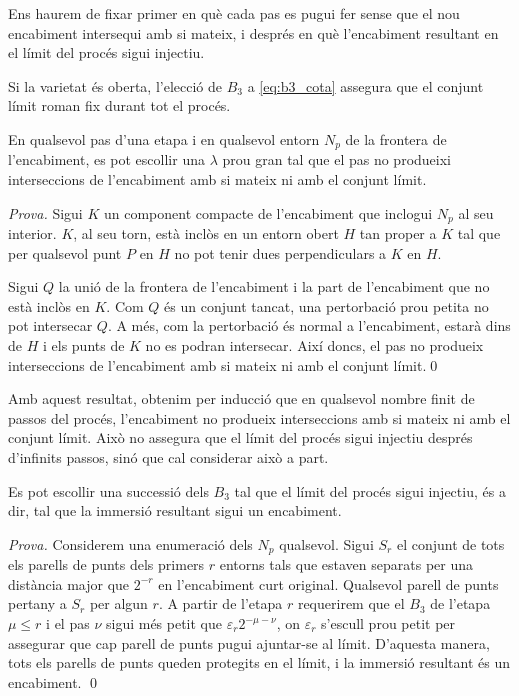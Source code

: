 Ens haurem de fixar primer en què cada pas es pugui fer sense que el nou encabiment intersequi amb si mateix, i després en què l'encabiment resultant en el límit del procés sigui injectiu.
\begin{obs}
    Si la varietat és oberta, l'elecció de $B_3$ a \eqref{eq:b3_cota} assegura que el conjunt límit roman fix durant tot el procés.
\end{obs}
\begin{prop}
    En qualsevol pas d'una etapa i en qualsevol entorn $N_p$ de la frontera de l'encabiment, es pot escollir una $\lambda$ prou gran tal que el pas no produeixi interseccions de l'encabiment amb si mateix ni amb el conjunt límit.
\end{prop}
{
\color{black} \textit{Prova.} 
    Sigui $K$ un component compacte de l'encabiment que inclogui $N_p$ al seu interior. $K$, al seu torn, està inclòs en un entorn obert $H$ tan proper a $K$ tal que per qualsevol punt $P$ en $H$ no pot tenir dues perpendiculars a $K$ en $H$.

    Sigui $Q$ la unió de la frontera de l'encabiment i la part de l'encabiment que no està inclòs en $K$. Com $Q$ és un conjunt tancat, una pertorbació prou petita no pot intersecar $Q$. A més, com la pertorbació és normal a l'encabiment, estarà dins de $H$ i els punts de $K$ no es podran intersecar. Així doncs, el pas no produeix interseccions de l'encabiment amb si mateix ni amb el conjunt límit.\qed
}

Amb aquest resultat, obtenim per inducció que en qualsevol nombre finit de passos del procés, l'encabiment no produeix interseccions amb si mateix ni amb el conjunt límit. Això no assegura que el límit del procés sigui injectiu després d'infinits passos, sinó que cal considerar això a part.

\begin{prop}
    Es pot escollir una successió dels $B_3$ tal que el límit del procés sigui injectiu, és a dir, tal que la immersió resultant sigui un encabiment.
\end{prop}
{
\color{black} \textit{Prova.} 
    Considerem una enumeració dels $N_p$ qualsevol. Sigui $S_r$ el conjunt de tots els parells de punts dels primers $r$ entorns tals que estaven separats per una distància major que $2^{-r}$ en l'encabiment curt original. Qualsevol parell de punts pertany a $S_r$ per algun $r$. A partir de l'etapa $r$ requerirem que el $B_3$ de l'etapa $\mu\le r$ i el pas $\nu$ sigui més petit que $\varepsilon_r2^{-\mu-\nu}$, on $\varepsilon_r$ s'escull prou petit per assegurar que cap parell de punts pugui ajuntar-se al límit. D'aquesta manera, tots els parells de punts queden protegits en el límit, i la immersió resultant és un encabiment. \qed
}
